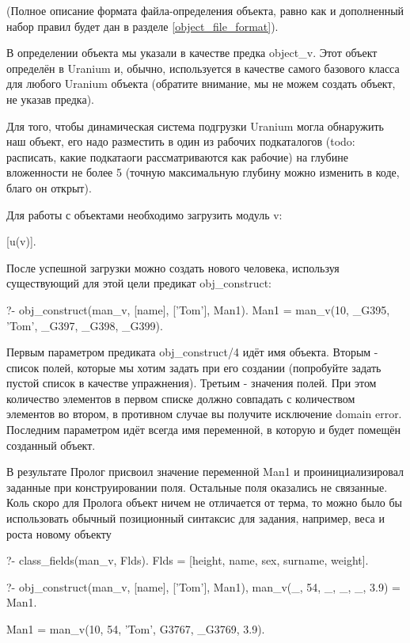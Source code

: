 \documentclass[a4paper]{book}
\def\ur{Uranium}
\begin{document}
(Полное описание формата файла-определения объекта, равно как и
дополненный набор правил будет дан в разделе
\ref{object_file_format}).

В определении объекта мы указали в качестве предка object_v. Этот
объект определён в \ur{} и, обычно, используется в качестве
самого базового класса для любого \ur{} объекта (обратите внимание,
мы не можем создать объект, не указав предка).

Для того, чтобы динамическая система подгрузки \ur{} могла обнаружить наш
объект, его надо разместить в один из рабочих подкаталогов (todo: расписать,
какие подкатаоги рассматриваются как рабочие) на глубине вложенности не более 5
(точную максимальную глубину можно изменить в коде, благо он открыт).

Для работы с объектами необходимо загрузить модуль v:

\begin{example}{}{}
[u(v)].
\end{example}

После успешной загрузки можно создать нового человека, используя
существующий для этой цели предикат obj_construct:


\begin{example}{}{}
?- obj_construct(man_v, [name], ['Tom'], Man1).
Man1 = man_v(10, _G395, 'Tom', _G397, _G398, _G399).
\end{example}

Первым параметром предиката obj_construct/4 идёт имя объекта. Вторым - список
полей, которые мы хотим задать при его создании (попробуйте задать пустой
список в качестве упражнения). Третьим - значения полей. При этом количество
элементов в первом списке должно совпадать с количеством элементов во втором, в
противном случае вы получите исключение domain error. Последним параметром
идёт всегда имя переменной, в которую и будет помещён созданный объект.

В результате Пролог присвоил значение переменной Man1 и
проинициализировал заданные при конструировании поля. Остальные
поля оказались не связанные. Коль скоро для Пролога объект ничем
не отличается от терма, то можно было бы использовать обычный
позиционный синтаксис для задания, например, веса и роста новому
объекту

\begin{example}{}{}
?- class_fields(man_v, Flds).
Flds = [height, name, sex, surname, weight].

?- obj_construct(man_v, [name], ['Tom'], Man1), 
   man_v(_, 54, _, _, _, 3.9) = Man1.

Man1 = man_v(10, 54, 'Tom', G3767, _G3769, 3.9).
\end{example}
\end{document}
